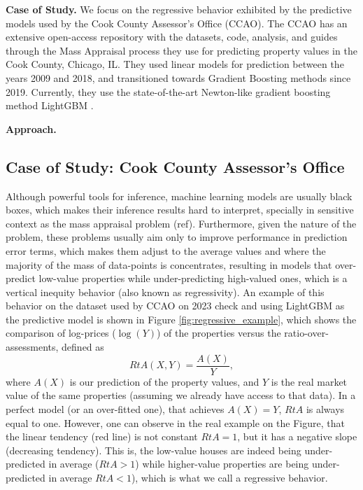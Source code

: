 \documentclass[11pt]{article}
\theoremstyle{plain}
\theoremstyle{definition}
\newcommand{\1}{\mathbf{1}}
\newcommand{\red}[1]{{\color{red} #1}}
\begin{document}
\textbf{Case of Study.} We focus on the regressive behavior exhibited by the predictive models used by the Cook County Assessor's Office (CCAO). The CCAO has an extensive open-access repository \cite{ccao_data_2026} with the datasets, code, analysis, and guides through the Mass Appraisal process they use for predicting property values in the Cook County, Chicago, IL. They used linear models for prediction between the years 2009 and 2018, and transitioned towards Gradient Boosting methods since 2019. Currently, they use the state-of-the-art Newton-like gradient boosting method LightGBM \cite{lightgbm}.

\textbf{Approach. } 






\printbibliography %



\subsection{Case of Study: Cook County Assessor's Office}

Although powerful tools for inference, machine learning models are usually black boxes, which makes their inference results hard to interpret, specially in sensitive context as the mass appraisal problem \red{(ref)}. Furthermore, given the nature of the problem, these problems usually aim only to improve performance in prediction error terms, which makes them adjust to the average values and where the majority of the mass of data-points is concentrates, resulting in models that over-predict low-value properties while under-predicting high-valued ones, which is a vertical inequity behavior (also known as regressivity). An example of this behavior on the dataset used by CCAO on 2023 \red{check} and using LightGBM as the predictive model is shown in Figure \ref{fig:regressive_example}, which shows the comparison of log-prices ($\log(Y)$) of the properties versus the ratio-over-assessments, defined as
$$
RtA(X, Y) = \frac{A(X)}{Y},
$$
where $A(X)$ is our prediction of the property values, and $Y$ is the real market value of the same properties (assuming we already have access to that data). In a perfect model (or an over-fitted one), that achieves $A(X)=Y$, $RtA$ is always equal to one. However, one can observe in the real example on the Figure, that the linear tendency (red line) is not constant $RtA=1$, but it has a negative slope (decreasing tendency). This is, the low-value houses are indeed being under-predicted in average ($RtA>1$) while higher-value properties are being under-predicted in average $RtA<1$), which is what we call a regressive behavior.
\end{document}
